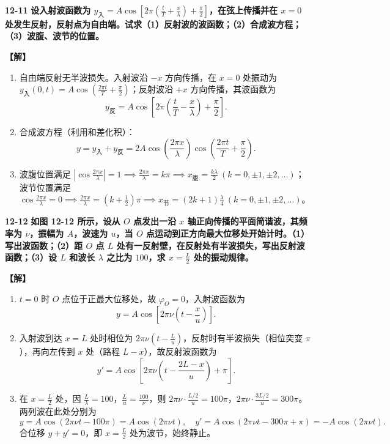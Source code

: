 \documentclass[zihao=5,a4paper,UTF8]{ctexart}
\newenvironment{prob}[2]{%
    \par\vspace{6pt}\noindent\textbf{\color{navy}#1} \textbf{#2}\par\nopagebreak\vspace{2pt}%
}{%
    \par\vspace{4pt}%
}
\newcommand{\sol}{\noindent\textbf{\color{tealaccent}【解】}\ }
\begin{document}
\begin{prob}{12-11}{设入射波函数为 $y_{\text{入}} = A\cos\left[2\pi\left(\frac{t}{T} + \frac{x}{\lambda}\right) + \frac{\pi}{2}\right]$，在弦上传播并在 $x=0$ 处发生反射，反射点为自由端。试求（1）反射波的波函数；（2）合成波方程；（3）波腹、波节的位置。}
\sol
\begin{enumerate}[leftmargin=2em, itemsep=2pt]
    \item 自由端反射无半波损失。入射波沿 $-x$ 方向传播，在 $x=0$ 处振动为 $y_{\text{入}}(0,t) = A\cos\left(\frac{2\pi t}{T} + \frac{\pi}{2}\right)$；反射波沿 $+x$ 方向传播，其波函数为
    \[
        y_{\text{反}} = A\cos\left[2\pi\left(\frac{t}{T} - \frac{x}{\lambda}\right) + \frac{\pi}{2}\right].
    \]
    \item 合成波方程（利用和差化积）：
    \[
        y = y_{\text{入}} + y_{\text{反}} = 2A\cos\left(\frac{2\pi x}{\lambda}\right)\cos\left(\frac{2\pi t}{T} + \frac{\pi}{2}\right).
    \]
    \item 波腹位置满足 $\left|\cos\frac{2\pi x}{\lambda}\right| = 1 \implies \frac{2\pi x}{\lambda} = k\pi \implies x_{\text{腹}} = \frac{k\lambda}{2}\ (k=0,\pm 1,\pm 2,\dots)$；\\
    波节位置满足 $\cos\frac{2\pi x}{\lambda} = 0 \implies \frac{2\pi x}{\lambda} = \left(k+\frac{1}{2}\right)\pi \implies x_{\text{节}} = (2k+1)\frac{\lambda}{4}\ (k=0,\pm 1,\pm 2,\dots)$。
\end{enumerate}
\end{prob}

\begin{prob}{12-12}{如图 12-12 所示，设从 $O$ 点发出一沿 $x$ 轴正向传播的平面简谐波，其频率为 $\nu$，振幅为 $A$，波速为 $u$，当 $O$ 点运动到正方向最大位移处开始计时。（1）写出波函数；（2）距 $O$ 点 $L$ 处有一反射壁，在反射处有半波损失，写出反射波函数；（3）设 $L$ 和波长 $\lambda$ 之比为 $100$，求 $x = \frac{L}{2}$ 处的振动规律。}
\sol
\begin{enumerate}[leftmargin=2em, itemsep=2pt]
    \item $t=0$ 时 $O$ 点位于正最大位移处，故 $\varphi_O = 0$，入射波函数为
    \[
        y = A\cos\left[2\pi\nu\left(t - \frac{x}{u}\right)\right].
    \]
    \item 入射波到达 $x=L$ 处时相位为 $2\pi\nu\left(t - \frac{L}{u}\right)$，反射时有半波损失（相位突变 $\pi$），再向左传到 $x$ 处（路程 $L-x$），故反射波函数为
    \[
        y' = A\cos\left[2\pi\nu\left(t - \frac{2L - x}{u}\right) + \pi\right].
    \]
    \item 在 $x = \frac{L}{2}$ 处，因 $\frac{L}{\lambda} = 100$，$\frac{L}{u} = \frac{100}{\nu}$，则 $2\pi\nu\cdot\frac{L/2}{u} = 100\pi$，$2\pi\nu\cdot\frac{3L/2}{u} = 300\pi$。两列波在此处分别为
    \[
        y = A\cos(2\pi\nu t - 100\pi) = A\cos(2\pi\nu t),\quad y' = A\cos(2\pi\nu t - 300\pi + \pi) = -A\cos(2\pi\nu t).
    \]
    合位移 $y + y' = 0$，即 $x = \frac{L}{2}$ 处为波节，始终静止。
\end{enumerate}
\end{prob}
\end{document}
